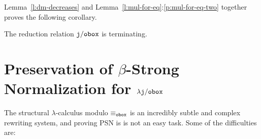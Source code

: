 \documentclass{LMCS}
\renewcommand{\>}{\rightarrow}
\def\lam{\lambda}
\newcommand{\dis}{{\tt j}}
\newcommand{\dm}[1]{\dis {\tt m}(#1)}
\newcommand{\modulo}[2]{#1/#2}
\newcommand{\ignore}[1]{}
\newcommand{\eqw}[1]{\equiv_{#1}}
\newcommand{\ldisf}{\lam \modulo{\dis}{\fsymb}}
\newcommand{\fsymb}{\osymb\boite}
\newcommand{\osymb}{{\tt o}}
\newcommand{\eqf}{\eqw{\fsymb}}
\newcommand{\boite}{{\tt box}}
\newcommand{\sigt}{\boite_1}
\newcommand{\sigq}{\boite_2}
\begin{document}
Lemma~\ref{l:dm-decreases} and
Lemma~\ref{l:mul-for-eq}:\ref{p:mul-for-eq-two} together proves the
following corollary.

\begin{cor}
\label{l:dis-f}
The reduction relation $\modulo{\dis}{\fsymb}$ is terminating.
\end{cor}

\ignore{
For the na\"ive equations it is possible to show that $t \equiv_{\sigt^0} u$ implies
$\dm{t} = \dm{u}$, while  $t \equiv_{\sigq^0} t'$ does not  imply $\dm{t} = \dm{t'}$, as Lemma \ref{xxx} will show.
}


\section{Preservation of $\beta$-Strong Normalization for $\ldisf$}
\label{sec:psn}

The structural $\lam$-calculus modulo $\eqf$ is an incredibly subtle and complex
rewriting system, and proving PSN is 
is not an easy task. Some of the difficulties are:
  
\end{document}
